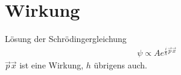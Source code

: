 \documentclass[ngerman]{scrartcl}
\begin{document}
\section{Wirkung}
	Lösung der Schrödingergleichung
	\begin{align*}
		\psi \propto A e^{\frac{i}{\hbar} \vec{p} \vec{x}}
	\end{align*}
	$\vec{p} \vec{x}$ ist eine Wirkung, $h$ übrigens auch. 
\newpage
\printbibliography
\end{document}
